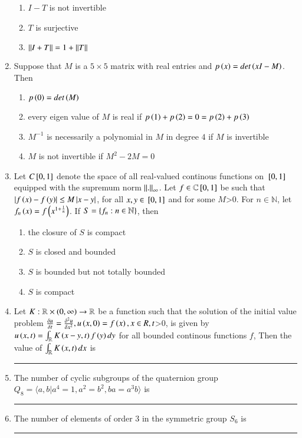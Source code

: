 \documentclass[journal]{IEEEtran}
\begin{document}
\begin{enumerate}
{\begin{multicols}{2}
\begin{enumerate}
\item $I-T$ is not invertible
\item $T$ is surjective 
\item $\left\lVert I+T\right\rVert=1+\left\lVert T\right\rVert$
\end{enumerate}
\end{multicols}
}
\item{
Suppose that $M$ is a $5\times 5$ matrix with real entries and $p\left(x\right)=det\left(xI-M\right)$. Then
\begin{enumerate}
\item $p\left(0\right)=det\left(M\right)$
\item every eigen value of $M$ is real if $p\left(1\right)+p\left(2\right)=0=p\left(2\right)+p\left(3\right)$
\item $M^{-1}$ is necessarily a polynomial in $M$ in degree $4$ if $M$ is invertible 
\item $M$ is not invertible if $M^2-2M=0$ 
\end{enumerate}
}
\item{
Let $C{}\left[0,1\right]$ denote the space of all real-valued continous functions on ${}\left[0,1\right]$ equipped with the supremum norm $\left\lVert.\right\rVert_{\infty}$. Let $f\in\mathbb{C}{}\left[0,1\right]$ be such that $\left\vert f\left(x\right)-f\left(y\right)\right\vert\leq M\left\vert x-y\right\vert$, for all $x,y\in{}\left[0,1\right]$ and for some $M$\textgreater$0$. For $n\in\mathbb{N}$, let $f_n\left(x\right)=f\left(x^{1+\frac{1}{n}}\right)$. If $S=\left\{f_n:n\in\mathbb{N}\right\}$, then 
\begin{multicols}{2}
\begin{enumerate}
\item the closure of $S$ is compact
\item $S$ is closed and bounded
\item $S$ is bounded but not totally bounded
\item $S$ is compact
\end{enumerate}
\end{multicols}
}
\item{
Let $K:\mathbb{R}\times\left(0,\infty\right)\rightarrow\mathbb{R}$ be a function such that the solution of the initial value problem $\frac{\delta u}{\delta t}=\frac{\delta^2u}{\delta x^2},u\left(x,0\right)=f\left(x\right),x\in R,t$\textgreater$0$, is given by $u\left(x,t\right)=\int_\mathbb{R}K\left(x-y,t\right)f\left(y\right)dy$ for all bounded continous functions $f$, Then the value of $\int_\mathbb{R}K\left(x,t\right)dx$ is \rule{2cm}{0.15mm}
}
\item{
The number of cyclic subgroups of the quaternion group $Q_8=\langle a,b|a^4=1,a^2=b^2,ba=a^3b\rangle$ is \rule{2cm}{0.15mm}
}
\item{
The number of elements of order $3$ in the symmetric group $S_6$ is \rule{2cm}{0.15mm}
}
\end{enumerate}
\end{document}
